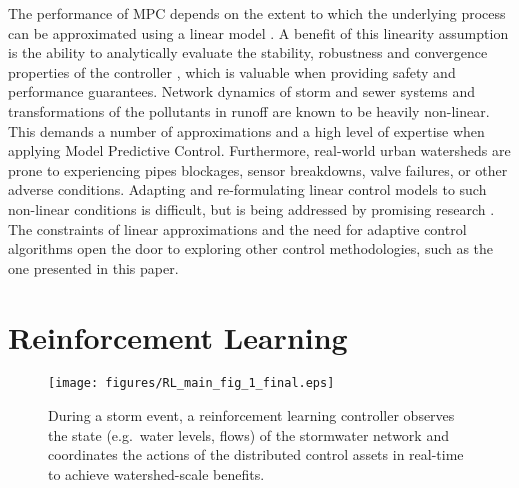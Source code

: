 The performance of MPC depends on the extent to which the underlying process can be approximated using a linear model \cite{van2006model}.
A benefit of this linearity assumption is the ability to analytically evaluate the stability, robustness and convergence properties of the controller \cite{Ogata201}, which is valuable when providing safety and performance guarantees.
Network dynamics of storm and sewer systems and transformations of the pollutants in runoff are known to be heavily non-linear.
This demands a number of approximations and a high level of expertise when applying Model Predictive Control.
Furthermore, real-world urban watersheds are prone to experiencing pipes blockages, sensor breakdowns, valve failures, or other adverse conditions.
Adapting and re-formulating linear control models to such non-linear conditions is difficult, but is being addressed by promising research \cite{wong2018real}.
The constraints of linear approximations and the need for adaptive control algorithms open the door to exploring other control methodologies, such as the one presented in this paper.

\section{Reinforcement Learning}

\begin{figure}[H]
    \centering
    \texttt{[image: figures/RL\_main\_fig\_1\_final.eps]}
    \caption{During a storm event, a reinforcement learning controller observes the state (e.g.\ water levels, flows)  of the stormwater network and coordinates the actions of the distributed control assets in real-time to achieve watershed-scale benefits.}
    \label{fig:1}
\end{figure}

